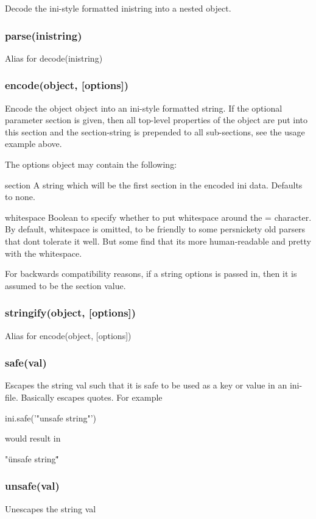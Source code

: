 Decode the ini-\/style formatted {\ttfamily inistring} into a nested object.

\subsubsection*{parse(inistring)}

Alias for {\ttfamily decode(inistring)}

\subsubsection*{encode(object, \mbox{[}options\mbox{]})}

Encode the object {\ttfamily object} into an ini-\/style formatted string. If the optional parameter {\ttfamily section} is given, then all top-\/level properties of the object are put into this section and the {\ttfamily section}-\/string is prepended to all sub-\/sections, see the usage example above.

The {\ttfamily options} object may contain the following\+:


\begin{DoxyItemize}
\item {\ttfamily section} A string which will be the first {\ttfamily section} in the encoded ini data. Defaults to none.
\item {\ttfamily whitespace} Boolean to specify whether to put whitespace around the {\ttfamily =} character. By default, whitespace is omitted, to be friendly to some persnickety old parsers that don\textquotesingle{}t tolerate it well. But some find that it\textquotesingle{}s more human-\/readable and pretty with the whitespace.
\end{DoxyItemize}

For backwards compatibility reasons, if a {\ttfamily string} options is passed in, then it is assumed to be the {\ttfamily section} value.

\subsubsection*{stringify(object, \mbox{[}options\mbox{]})}

Alias for {\ttfamily encode(object, \mbox{[}options\mbox{]})}

\subsubsection*{safe(val)}

Escapes the string {\ttfamily val} such that it is safe to be used as a key or value in an ini-\/file. Basically escapes quotes. For example \begin{DoxyVerb}ini.safe('"unsafe string"')
\end{DoxyVerb}


would result in \begin{DoxyVerb}"\"unsafe string\""
\end{DoxyVerb}


\subsubsection*{unsafe(val)}

Unescapes the string {\ttfamily val} 